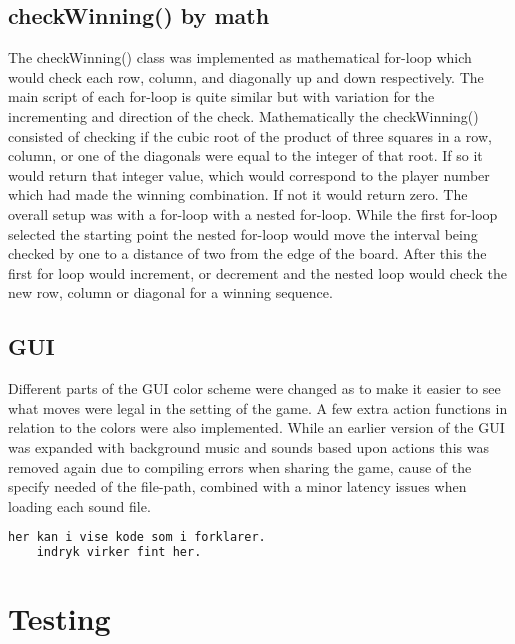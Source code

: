 \documentclass[a4paper,10pt]{article}
\begin{document}
	\subsection{checkWinning() by math}
	The checkWinning() class was implemented as mathematical for-loop which would check each row, column, and diagonally up and down respectively. The main script of each for-loop is quite similar but with  variation for the incrementing and direction of the check. 
	Mathematically the checkWinning() consisted of checking if the cubic root of the product of three squares in a row, column, or one of the diagonals were equal to the integer of that root. If so it would return that integer value, which would correspond to the player number which had made the winning combination. If not it would return zero.  
	The overall setup was with a for-loop with a nested for-loop. While the first for-loop selected the starting point the nested for-loop would move the interval being checked by one to a distance of two from the edge of the board. After this the first for loop would increment, or decrement and the nested loop would check the new row, column or diagonal for a winning sequence. 
	
	\subsection{GUI}
	Different parts of the GUI color scheme were changed as to make it easier to see what moves were legal in the setting of the game.  A few extra action functions in relation to the colors were also implemented. While an earlier version of the GUI was expanded with background music and sounds based upon actions this was removed again due to compiling errors when sharing the game, cause of the specify needed of the file-path, combined with a minor latency issues when loading each sound file.
	\begin{lstlisting}[language=python]
	her kan i vise kode som i forklarer.
	indryk virker fint her.
	\end{lstlisting}
	
	
	\section{Testing}
\end{document}
